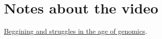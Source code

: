 
\section{Notes about the video}

\href{https://www.youtube.com/watch?v=hS47TcdiKUU}{Beggining and struggles in the age of genomics}.

\paragraph{}